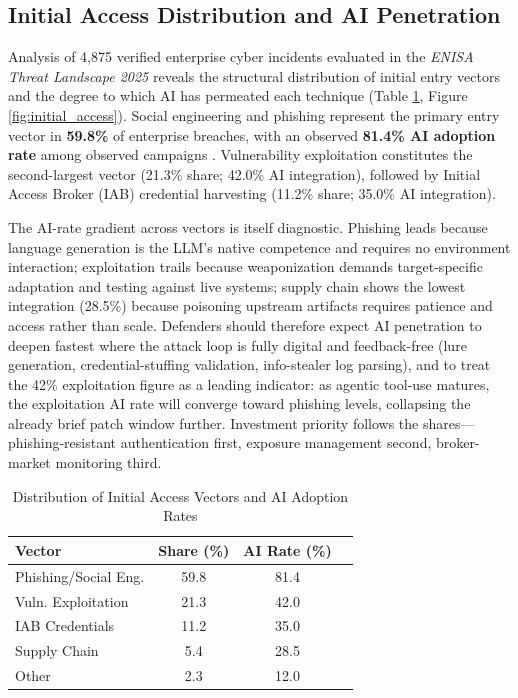 \documentclass[conference,10pt,twocolumn,a4paper]{IEEEtran}
\begin{document}
\subsection{Initial Access Distribution and AI Penetration}
Analysis of 4,875 verified enterprise cyber incidents evaluated in the \emph{ENISA Threat Landscape 2025} reveals the structural distribution of initial entry vectors and the degree to which AI has permeated each technique (Table \ref{tab:iiv}, Figure \ref{fig:initial_access}). Social engineering and phishing represent the primary entry vector in \textbf{59.8\%} of enterprise breaches, with an observed \textbf{81.4\% AI adoption rate} among observed campaigns \cite{enisa_etl_2025}. Vulnerability exploitation constitutes the second-largest vector (21.3\% share; 42.0\% AI integration), followed by Initial Access Broker (IAB) credential harvesting (11.2\% share; 35.0\% AI integration).

The AI-rate gradient across vectors is itself diagnostic. Phishing leads because language generation is the LLM's native competence and requires no environment interaction; exploitation trails because weaponization demands target-specific adaptation and testing against live systems; supply chain shows the lowest integration (28.5\%) because poisoning upstream artifacts requires patience and access rather than scale. Defenders should therefore expect AI penetration to deepen fastest where the attack loop is fully digital and feedback-free (lure generation, credential-stuffing validation, info-stealer log parsing), and to treat the 42\% exploitation figure as a leading indicator: as agentic tool-use matures, the exploitation AI rate will converge toward phishing levels, collapsing the already brief patch window further. Investment priority follows the shares---phishing-resistant authentication first, exposure management second, broker-market monitoring third.

\begin{table}[t]
\caption{Distribution of Initial Access Vectors and AI Adoption Rates}
\label{tab:iiv}
\centering
\footnotesize
\begin{tabular}{lccc}
\toprule
Vector & Share (\%) & AI Rate (\%) \\
\midrule
Phishing/Social Eng. & 59.8 & 81.4 \\
Vuln. Exploitation & 21.3 & 42.0 \\
IAB Credentials & 11.2 & 35.0 \\
Supply Chain & 5.4 & 28.5 \\
Other & 2.3 & 12.0 \\
\bottomrule
\end{tabular}
\end{table}
\end{document}
